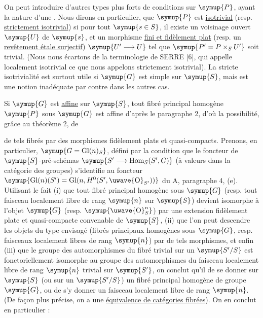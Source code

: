 On peut introduire d'autres types plus forts de conditions sur $\symup{P}$, ayant la
nature d'une . Nous dirons en particulier, que $\symup{P}$ est
\uline{isotrivial} (resp. \uline{strictement isotrivial}) si pour tout $\symup{s\in S}$, il existe un
voisinage ouvert $\symup{U}$ de $\symup{s}$, et un morphisme \uline{fini et fidèlement plat} (resp. un
\uline{revêtement étale surjectif}) $\symup{U'\longrightarrow U}$ tel que
$\symup{P'=P\times_SU'}$ soit trivial. (Nous nous écartons de la terminologie de SERRE
[6], qui appelle localement isotrivial ce que nous appelons strictement
isotrivial). La stricte isotrivialité est surtout utile si $\symup{G}$ est simple sur
$\symup{S}$, mais est une notion inadéquate par contre dans les autres cas.

Si $\symup{G}$ est \uline{affine} sur $\symup{S}$, tout fibré principal homogène $\symup{P}$ sous $\symup{G}$ est
affine d'après le paragraphe 2, d'où la possibilité, grâce au théorème 2, de

de tels fibrés par des morphismes fidèlement plats et quasi-compacts. Prenons,
en particulier, $\symup{G=\operatorname{Gl}(n)_S}$, défini par la condition que le
foncteur de $\symup{S}$-pré-schémas
$\symup{S'\longrightarrow\operatorname{Hom}_S(S',G)}$
(à valeurs dans la catégorie des groupes) s'identifie au foncteur
$\symup{\operatorname{Gl}(n)(S')=\operatorname{Gl}(n,H^0(S',\text{\uwave{O}}_{S'}))}$
du A, paragraphe 4, (e). Utilisant le fait (i) que tout fibré principal homogène
sous $\symup{G}$ (resp. tout faisceau localement libre de rang $\symup{n}$ sur $\symup{S}$) devient
isomorphe à l'objet  $\symup{G}$ (resp. $\symup{\text{\uwave{O}}_S^n}$) par une extension
fidèlement plate et quasi-compacte convenable de $\symup{S}$, (ii) que l'on peut
descendre les objets du type envisagé (fibrés principaux homogènes sous $\symup{G}$,
resp. faisceaux localement libres de rang $\symup{n}$) par de tels morphismes, et enfin
(iii) que le groupe des automorphismes du fibré trivial sur un $\symup{S'/S}$ est
fonctoriellement isomorphe au groupe des automorphismes du faisceau localement
libre de rang $\symup{n}$ trivial sur $\symup{S'}$, on conclut  qu'il  de se donner sur $\symup{S}$ (ou sur un $\symup{S'/S}$) un fibré principal homogène
de groupe $\symup{G}$, ou de s'y donner un faisceau localement libre de rang $\symup{n}$. (De
façon plus précise, on a une \uline{équivalence de catégories fibrées}). On en conclut
en particulier :

